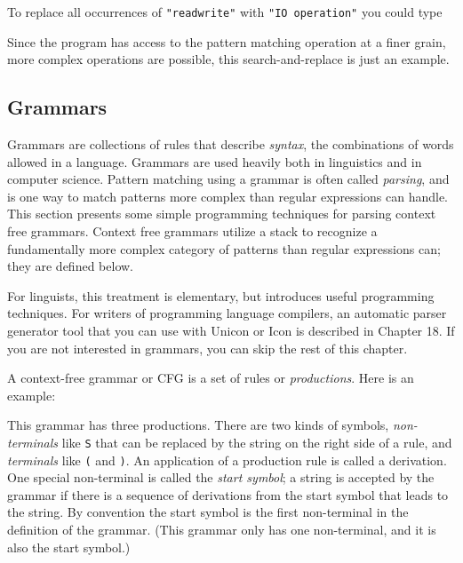 To replace all occurrences of
\texttt{"read{\textbar}write"} with
\texttt{"IO operation"} you could type 


Since the program has access to the pattern matching operation at a
finer grain, more complex operations are possible, this
search-and-replace is just an example.

\subsection{Grammars}

Grammars are collections of rules that describe
\textit{syntax}, the combinations of words allowed in a
language. Grammars are used heavily both in linguistics and in computer
science. Pattern matching using a grammar is
often called \textit{parsing}, and is one way to match
patterns more complex than regular expressions can handle. This section
presents some simple programming techniques for parsing context free
grammars. Context free grammars utilize a stack to
recognize a fundamentally more complex category of patterns than
regular expressions can; they are defined below.

For linguists, this treatment is elementary, but introduces useful
programming techniques. For writers of programming language compilers,
an automatic parser generator tool that you can use with Unicon or Icon
is described in Chapter 18. If you are not interested in grammars, you
can skip the rest of this chapter.

A context-free grammar or CFG is a set of
rules or \textit{productions}. Here is an example:


This grammar has three productions. There are two kinds of symbols,
\textit{non-terminals} like \texttt{S} that can be replaced by the
string on the right side of a rule, and \textit{terminals} like
\texttt{(} and \texttt{)}. An application of a production rule is called
a derivation. One special non-terminal is called the
\textit{start symbol}; a string is accepted by the grammar if there is a
sequence of derivations from the start symbol that leads to the string.
By convention the start symbol is the first non-terminal in the
definition of the grammar. (This grammar only has one non-terminal, and
it is also the start symbol.)

